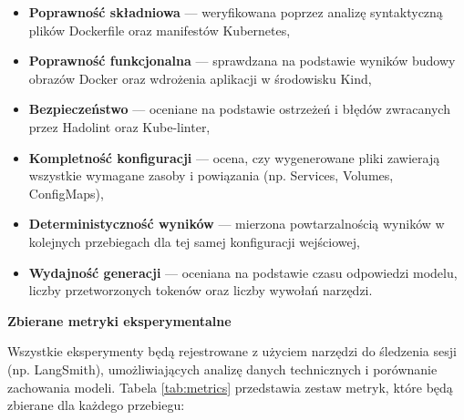 \begin{itemize}
    \item \textbf{Poprawność składniowa} — weryfikowana poprzez analizę syntaktyczną plików Dockerfile oraz manifestów Kubernetes,
    \item \textbf{Poprawność funkcjonalna} — sprawdzana na podstawie wyników budowy obrazów Docker oraz wdrożenia aplikacji w środowisku Kind,
    \item \textbf{Bezpieczeństwo} — oceniane na podstawie ostrzeżeń i błędów zwracanych przez Hadolint oraz Kube-linter,
    \item \textbf{Kompletność konfiguracji} — ocena, czy wygenerowane pliki zawierają wszystkie wymagane zasoby i powiązania (np. Services, Volumes, ConfigMaps),
    \item \textbf{Deterministyczność wyników} — mierzona powtarzalnością wyników w kolejnych przebiegach dla tej samej konfiguracji wejściowej,
    \item \textbf{Wydajność generacji} — oceniana na podstawie czasu odpowiedzi modelu, liczby przetworzonych tokenów oraz liczby wywołań narzędzi.
\end{itemize}

\bigskip
\noindent
\textbf{Zbierane metryki eksperymentalne}

Wszystkie eksperymenty będą rejestrowane z użyciem narzędzi do śledzenia sesji (np. LangSmith), umożliwiających analizę danych technicznych i porównanie zachowania modeli. Tabela \ref{tab:metrics} przedstawia zestaw metryk, które będą zbierane dla każdego przebiegu:

